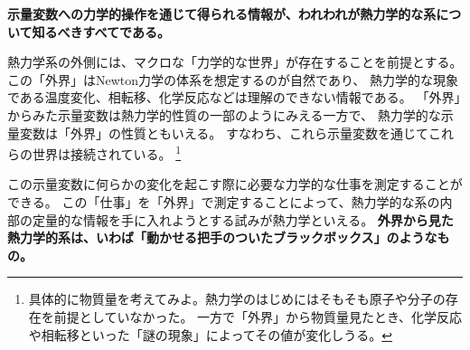 \textbf{
  示量変数への力学的操作を通じて得られる情報が、われわれが熱力学的な系について知るべきすべてである。
}

熱力学系の外側には、マクロな「力学的な世界」が存在することを前提とする。
この「外界」はNewton力学の体系を想定するのが自然であり、
熱力学的な現象である温度変化、相転移、化学反応などは理解のできない情報である。
「外界」からみた示量変数は熱力学的性質の一部のようにみえる一方で、
熱力学的な示量変数は「外界」の性質ともいえる。
すなわち、これら示量変数を通じてこれらの世界は接続されている。
\footnote{
  具体的に物質量を考えてみよ。熱力学のはじめにはそもそも原子や分子の存在を前提としていなかった。
  一方で「外界」から物質量見たとき、化学反応や相転移といった「謎の現象」によってその値が変化しうる。
}

この示量変数に何らかの変化を起こす際に必要な力学的な仕事を測定することができる。
この「仕事」を「外界」で測定することによって、熱力学的な系の内部の定量的な情報を手に入れようとする試みが熱力学といえる。
\textbf{
  外界から見た熱力学的系は、いわば「動かせる把手のついたブラックボックス」のようなもの。
}
